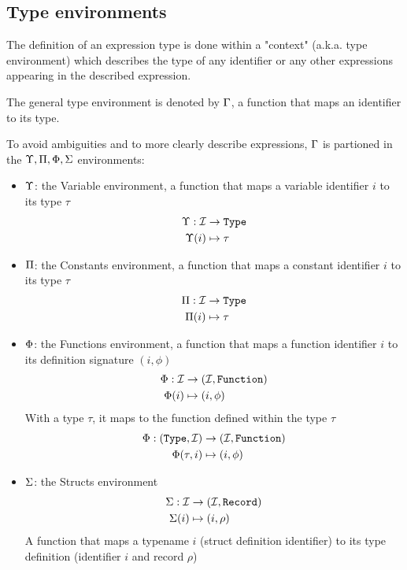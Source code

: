 \clearpage

\subsection{Type environments}

The definition of an expression type is done within a "context" (a.k.a. type
environment) which describes the type of any identifier or any other
expressions appearing in the described expression.

The general type environment is denoted by $\Gamma$, a function that maps an
identifier to its type.

To avoid ambiguities and to more clearly describe expressions, $\Gamma$ is
partioned in the $\Upsilon,\Pi,\Phi,\Sigma$ environments:

\begin{itemize}
	\item $\Upsilon$: the Variable environment, a function that maps a variable
		identifier $i$ to its type $\tau$
		\[
			\begin{split}
				\Upsilon : \mathcal{I} &\to \texttt{Type}\\*
				\Upsilon(i)    &\mapsto \tau
			\end{split}
		\]
	\item $\Pi$: the Constants environment, a function that maps a
		constant identifier $i$ to its type $\tau$
		\[
			\begin{split}
				\Pi : \mathcal{I} &\to \texttt{Type}\\*
				\Pi(i)    &\mapsto \tau
			\end{split}
		\]
	\item $\Phi$: the Functions environment, a function that maps a
		function identifier $i$ to its definition signature $(i, \phi)$
		\[
			\begin{split}
				\Phi : \mathcal{I} &\to (\mathcal{I}, \texttt{Function})\\*
				\Phi(i)    &\mapsto (i, \phi)
			\end{split}
		\]
		With a type $\tau$, it maps to the function defined within the type
		$\tau$
		\[
			\begin{split}
				\Phi : (\texttt{Type},\mathcal{I}) &\to (\mathcal{I}, \texttt{Function})\\*
				\Phi(\tau, i)      &\mapsto (i, \phi)
			\end{split}
		\]
	\item $\Sigma$: the Structs environment
		\[
			\begin{split}
				\Sigma : \mathcal{I} &\to (\mathcal{I}, \texttt{Record})\\*
				\Sigma(i)    &\mapsto (i, \rho)
			\end{split}
		\]
		A function that maps a typename $i$ (struct definition identifier) to
		its type definition (identifier $i$ and record $\rho$)
\end{itemize}

